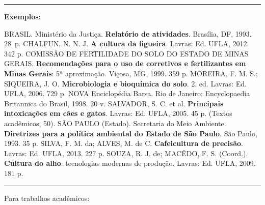 \noindent\rule{12.5cm}{0.4pt}
\begin{flushleft}
\textbf{Exemplos:}

\begin{singlespace}
BRASIL. Ministério da Justiça. \textbf{Relatório de atividades}. Brasília, DF,
1993. 28~p.
\newline
\newline
CHALFUN, N. N. J. \textbf{A cultura da figueira}. Lavras: Ed. UFLA, 2012. 342 p. 
\newline
\newline
COMISSÃO DE FERTILIDADE DO SOLO DO ESTADO DE MINAS GERAIS. \textbf{Recomendações para o uso de corretivos e fertilizantes em Minas Gerais}: 5ª aproximação. Viçosa, MG, 1999. 359 p.
\newline
\newline
MOREIRA, F. M. S.; SIQUEIRA, J. O. \textbf{Microbiologia e bioquímica do solo}. 2. ed. Lavras: Ed. UFLA, 2006. 729 p. 
\newline
\newline
NOVA Enciclopédia Barsa.  Rio de Janeiro: Encyclopaedia Britannica do Brasil, 1998. 20 v.
\newline
\newline
SALVADOR, S. C. et al. \textbf{Principais intoxicações em cães e gatos}. Lavras: Ed. UFLA, 2005. 45 p. (Textos acadêmicos, 50).
\newline
\newline
SÃO PAULO (Estado). Secretaria do Meio Ambiente. \textbf{Diretrizes para a política ambiental do Estado de São Paulo}. São Paulo, 1993. 35 p.
\newline
\newline
SILVA, F. M. da; ALVES, M. de C. \textbf{Cafeicultura de precisão}. Lavras: Ed. UFLA, 2013. 227 p.
\newline
\newline
SOUZA, R. J. de; MACÊDO, F. S. (Coord.). \textbf{Cultura do alho}: tecnologias modernas de produção. Lavras: Ed. UFLA, 2009. 181 p.
\end{singlespace}
\end{flushleft}
\noindent\rule{12.5cm}{0.4pt}

Para trabalhos acadêmicos:

\begin{flushleft}
\begin{singlespace}
\end{singlespace}
\end{flushleft}

